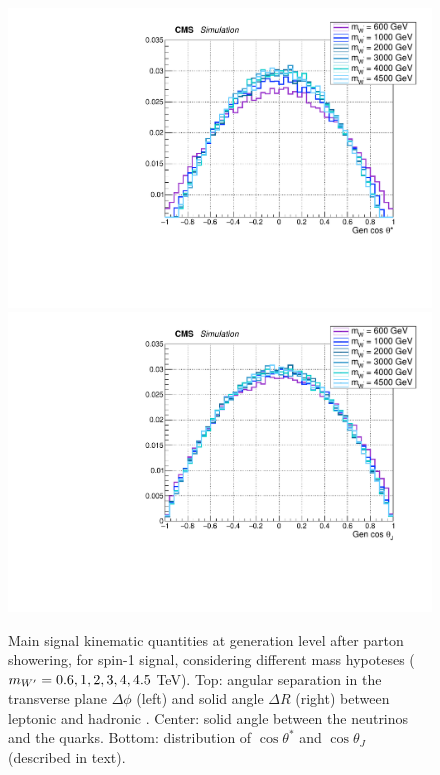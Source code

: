 \begin{figure}[!htb]
\begin{center}
     \includegraphics[width=.495\textwidth]{Gen_v9/XWZInv_g_CosThetaStar.pdf}%
     \includegraphics[width=.495\textwidth]{Gen_v9/XWZInv_g_CosThetaJ.pdf}%
   \end{center}
   \caption{Main signal kinematic quantities at generation level after parton showering, for spin-1 \Wp signal, considering different mass hypoteses ($m_{W'} = 0.6, 1, 2, 3, 4, 4.5$ TeV). Top: angular separation in the transverse plane $\Delta \phi$ (left) and solid angle $\Delta R$ (right) between leptonic \Z and hadronic \W. Center: solid angle between the neutrinos and the quarks. Bottom: distribution of $\cos{\theta}^{*}$ and $\cos{\theta}_{J}$ (described in text).}
   \label{fig:genWprimeSignal3}
 \end{figure}

\clearpage

